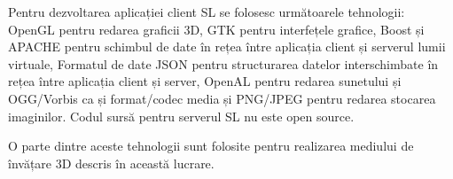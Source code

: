 \par Pentru dezvoltarea aplicației client SL se folosesc următoarele tehnologii: OpenGL pentru redarea graficii 3D, GTK pentru interfețele grafice, Boost și APACHE pentru schimbul de date în rețea între aplicația client și serverul lumii virtuale, Formatul de date JSON pentru structurarea datelor interschimbate în rețea între aplicația client și server, OpenAL pentru redarea sunetului și OGG/Vorbis ca și format/codec media și PNG/JPEG pentru redarea stocarea imaginilor. Codul sursă pentru serverul SL nu este open source.

\par O parte dintre aceste tehnologii sunt folosite pentru realizarea mediului de învățare 3D descris în această lucrare.
